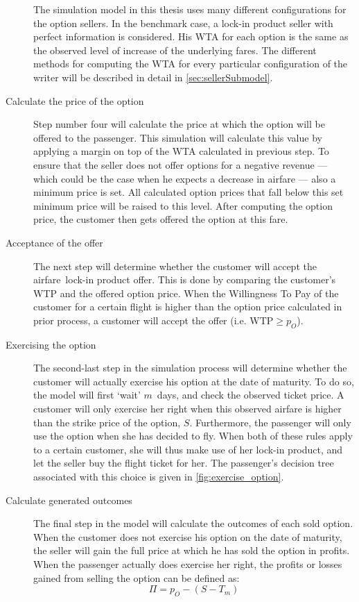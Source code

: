 \begin{description}
The simulation model in this thesis uses many different configurations for the option sellers. In the benchmark case, a lock-in product seller with perfect information is considered. His WTA for each option is the same as the observed level of increase of the underlying fares. The different methods for computing the WTA for every particular configuration of the writer will be described in detail in \autoref{sec:sellerSubmodel}.

\item[Calculate the price of the option] Step number four will calculate the price at which the option will be offered to the passenger. This simulation will calculate this value by applying a margin on top of the WTA calculated in previous step. To ensure that the seller does not offer options for a negative revenue --- which could be the case when he expects a decrease in airfare --- also a minimum price is set. All calculated option prices that fall below this set minimum price will be raised to this level. After computing the option price, the customer then gets offered the option at this fare.

\item[Acceptance of the offer] The next step will determine whether the customer will accept the airfare~lock-in product offer. This is done by comparing the customer's WTP and the offered option price. When the Willingness To Pay of the customer for a certain flight is higher than the option price calculated in prior process, a customer will accept the offer (i.e. $\text{WTP} \ge p_O$).

\item[Exercising the option] The second-last step in the simulation process will determine whether the customer will actually exercise his option at the date of maturity. To do so, the model will first `wait' $m$~days, and check the observed ticket price. A customer will only exercise her right when this observed airfare is higher than the strike price of the option, $S$. Furthermore, the passenger will only use the option when she has decided to fly. When both of these rules apply to a certain customer, she will thus make use of her lock-in product, and let the seller buy the flight ticket for her. The passenger's decision tree associated with this choice is given in \autoref{fig:exercise_option}.


\item[Calculate generated outcomes] The final step in the model will calculate the outcomes of each sold option. When the customer does not exercise his option on the date of maturity, the seller will gain the full price at which he has sold the option in profits. When the passenger actually does exercise her right, the profits or losses gained from selling the option can be defined as:
$$ \Pi = p_O - (S - T_m) $$
\end{description}

